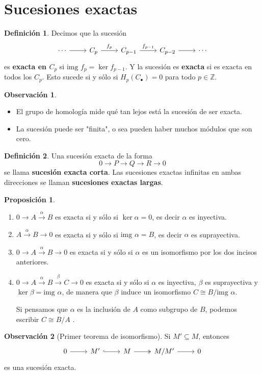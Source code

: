 \documentclass[spanish]{book}
\theoremstyle{definition}
\newtheorem*{defn}{Definición}
\newtheorem*{obs}{Observación}
\newtheorem*{prop}{Proposición}
\begin{document}
	\section{Sucesiones exactas}
	\begin{defn}
		Decimos que la sucesión 
		\[
		\begin{tikzcd}
			\cdots \arrow{r} & C_p \arrow{r}{f_p} & C_{p-1} \arrow{r}{f_{p-1}} & C_{p-2} \arrow{r} & \cdots
		\end{tikzcd}
		\]
		es \textbf{exacta en $C_p$} si  $\text{img }f_p=\ker{f_{p-1}}$. Y la sucesión es \textbf{exacta} si es exacta en todos los $C_p$. Esto sucede si y sólo si $H_p(C_\bullet{})=0$ para todo $p\in\mathbb{Z}$.
	\end{defn}
	\begin{obs}\leavevmode
		\begin{itemize}
			\item El grupo de homología mide qué tan lejos está la sucesión de ser exacta.
			\item La sucesión puede ser "finita", o sea pueden haber muchos módulos que son cero.
		\end{itemize}
	\end{obs}
	\begin{defn}
		Una sucesión exacta de la forma $$0\to P\to Q\to R\to 0$$ se llama \textbf{sucesión exacta corta}. Las sucesiones exactas infinitas en ambas direcciones se llaman \textbf{sucesiones exactas largas}.
	\end{defn}
	\begin{prop}\leavevmode
		\begin{enumerate}
			\item $0\to A\xrightarrow{\alpha}B$ es exacta si y sólo si $\ker{\alpha}=0$, es decir $\alpha $ es inyectiva.
			\item $A\xrightarrow{\alpha}B\to 0$ es exacta si y sólo si $\text{img }{\alpha}=B$, es decir $\alpha $ es suprayectiva.
			\item $0\to A\xrightarrow{\alpha}B\to 0$ es exacta si y sólo si $\alpha $ es un isomorfismo por los dos incisos anteriores.
			\item $0\to A\xrightarrow{\alpha}B\xrightarrow{\beta} C\to0$ es exacta si y sólo si $\alpha$ es inyectiva, $\beta$ es suprayectiva y $\ker\beta=\text{img }\alpha$, de manera que $\beta$ induce un isomorfismo $C\cong B/\text{img }\alpha$.\par
			Si pensamos que $\alpha$ es la inclusión de $A$ como subgrupo de $B$, podemos escribir $C\cong B/A$ .
		\end{enumerate}
	\end{prop}
	\begin{obs}[Primer teorema de isomorfismo] Si $M'\subseteq M$, entonces
		\[
		\begin{tikzcd}
			0 \arrow{r} & M' \arrow[hookrightarrow]{r} & M \arrow[twoheadrightarrow]{r} & M/M' \arrow{r} & 0
		\end{tikzcd}
		\]
		es una sucesión exacta.
	\end{obs}
\end{document}
